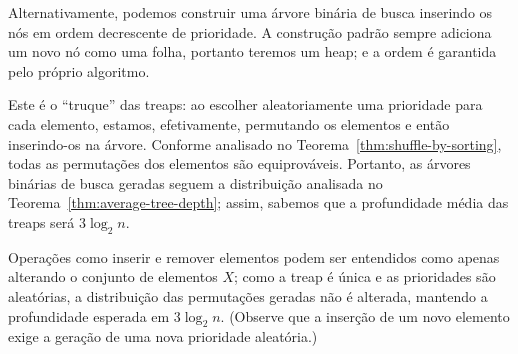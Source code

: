 Alternativamente,
podemos construir uma árvore binária de busca
inserindo os nós em ordem decrescente de prioridade.
A construção padrão sempre adiciona um novo nó como uma folha,
portanto teremos um heap;
e a ordem é garantida pelo próprio algoritmo.

Este é o ``truque'' das treaps:
ao escolher aleatoriamente uma prioridade para cada elemento,
estamos, efetivamente,
permutando os elementos e então inserindo-os na árvore.
Conforme analisado no Teorema~\ref{thm:shuffle-by-sorting},
todas as permutações dos elementos são equiprováveis.
Portanto,
as árvores binárias de busca geradas
seguem a distribuição analisada no Teorema~\ref{thm:average-tree-depth};
assim,
sabemos que a profundidade média das treaps será $3 \log_2 n$.

Operações como inserir e remover elementos
podem ser entendidos como apenas alterando o conjunto de elementos $X$;
como a treap é única e as prioridades são aleatórias,
a distribuição das permutações geradas não é alterada,
mantendo a profundidade esperada em $3 \log_2 n$.
(Observe que a inserção de um novo elemento
exige a geração de uma nova prioridade aleatória.)
